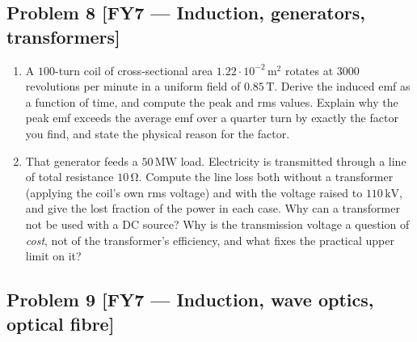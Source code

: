 \documentclass[11pt,a4paper]{article}
\newcommand{\problem}[3]{%
  \subsection*{Problem #1 \;\textnormal{\small[#2]}}\label{prob:#3}%
}
\newcommand{\unit}[1]{\,\mathrm{#1}}
\newenvironment{parts}{\begin{enumerate}[label=\textbf{\alph*)}]}{\end{enumerate}}
\begin{document}
\problem{8}{FY7 --- Induction, generators, transformers}{fy7}

\begin{parts}
\item A $100$-turn coil of cross-sectional area $1.22\cdot10^{-2}\unit{m^2}$
      rotates at $3000$ revolutions per minute in a uniform field of
      $0.85\unit{T}$. Derive the induced emf as a function of time, and
      compute the peak and rms values. Explain why the peak emf exceeds the
      average emf over a quarter turn by exactly the factor you find, and
      state the physical reason for the factor.
\item That generator feeds a $50\unit{MW}$ load. Electricity is transmitted
      through a line of total resistance $10\unit{\Omega}$. Compute the line
      loss both without a transformer (applying the coil's own rms voltage)
      and with the voltage raised to $110\unit{kV}$, and give the lost
      fraction of the power in each case. Why can a transformer not be used
      with a DC source? Why is the transmission voltage a question of
      \emph{cost}, not of the transformer's efficiency, and what fixes the
      practical upper limit on it?
\end{parts}

\problem{9}{FY7 --- Induction, wave optics, optical fibre}{fy7b}
\end{document}
